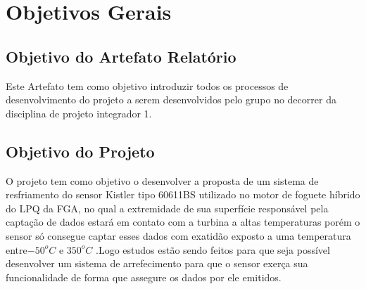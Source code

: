 \chapter{Objetivos Gerais}
\section{Objetivo do Artefato Relatório}
Este Artefato tem como objetivo introduzir todos os processos de desenvolvimento do projeto a serem desenvolvidos pelo grupo no decorrer  da disciplina  de projeto integrador 1.
\section{Objetivo do Projeto}
O projeto tem como objetivo o desenvolver a proposta de um sistema de resfriamento do sensor Kistler tipo 60611BS utilizado no motor de foguete híbrido do LPQ da FGA, no qual a extremidade de sua superfície responsável pela captação de dados estará em contato com a turbina a altas temperaturas porém o sensor só consegue captar esses dados com exatidão exposto a uma temperatura entre$-50^{o}C$ e $350^{o}C$ .Logo estudos estão sendo feitos para que seja possível desenvolver um sistema de arrefecimento para que o sensor exerça sua funcionalidade de forma que assegure os dados por ele emitidos.

